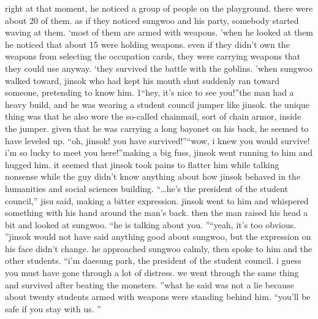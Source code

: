 right at that moment, he noticed a group of people on the playground.
 there were about 20 of them.
 as if they noticed sungwoo and his party, somebody started waving at them.
‘most of them are armed with weapons.
’when he looked at them he noticed that about 15 were holding weapons.
 even if they didn’t own the weapons from selecting the occupation cards, they were carrying weapons that they could use anyway.
‘they survived the battle with the goblins.
’when sungwoo walked toward, jinsok who had kept his mouth shut suddenly ran toward someone, pretending to know him.
1“hey, it’s nice to see you!”the man had a heavy build, and he was wearing a student council jumper like jinsok.
 the unique thing was that he also wore the so-called chainmail, sort of chain armor, inside the jumper.
 given that he was carrying a long bayonet on his back, he seemed to have leveled up.
“oh, jinsok! you have survived!”“wow, i knew you would survive! i’m so lucky to meet you here!”making a big fuss, jinsok went running to him and hugged him.
 it seemed that jinsok took pains to flatter him while talking nonsense while the guy didn’t know anything about how jinsok behaved in the humanities and social sciences building.
“…he’s the president of the student council,” jisu said, making a bitter expression.
jinsok went to him and whispered something with his hand around the man’s back.
 then the man raised his head a bit and looked at sungwoo.
“he is talking about you.
”“yeah, it’s too obvious.
”jinsok would not have said anything good about sungwoo, but the expression on his face didn’t change.
 he approached sungwoo calmly, then spoke to him and the other students.
“i’m daesung park, the president of the student council.
 i guess you must have gone through a lot of distress.
 we went through the same thing and survived after beating the monsters.
”what he said was not a lie because about twenty students armed with weapons were standing behind him.
“you’ll be safe if you stay with us.
”

 